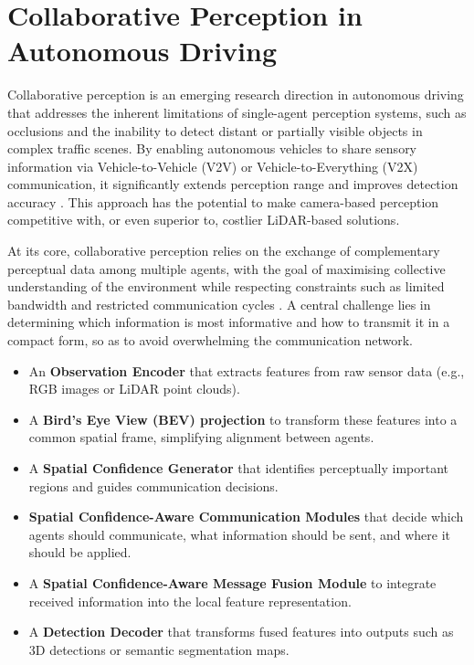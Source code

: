 \section{Collaborative Perception in Autonomous Driving}

Collaborative perception is an emerging research direction in autonomous driving that addresses the inherent limitations of single-agent perception systems, such as occlusions and the inability to detect distant or partially visible objects in complex traffic scenes.
By enabling autonomous vehicles to share sensory information via Vehicle-to-Vehicle (V2V) or Vehicle-to-Everything (V2X) communication, it significantly extends perception range and improves detection accuracy \cite{hu2022where2commcommunicationefficientcollaborativeperception, xu2022cobevtcooperativebirdseye}.
This approach has the potential to make camera-based perception competitive with, or even superior to, costlier LiDAR-based solutions.

At its core, collaborative perception relies on the exchange of complementary perceptual data among multiple agents, with the goal of maximising collective understanding of the environment while respecting constraints such as limited bandwidth and restricted communication cycles \cite{hu2023collaborationhelpscameraovertake}.
A central challenge lies in determining which information is most informative and how to transmit it in a compact form, so as to avoid overwhelming the communication network.

\begin{itemize}
    \item An \textbf{Observation Encoder} that extracts features from raw sensor data (e.g., RGB images or LiDAR point clouds).
    \item A \textbf{Bird’s Eye View (BEV) projection} to transform these features into a common spatial frame, simplifying alignment between agents.
    \item A \textbf{Spatial Confidence Generator} that identifies perceptually important regions and guides communication decisions.
    \item \textbf{Spatial Confidence-Aware Communication Modules} that decide which agents should communicate, what information should be sent, and where it should be applied.
    \item A \textbf{Spatial Confidence-Aware Message Fusion Module} to integrate received information into the local feature representation.
    \item A \textbf{Detection Decoder} that transforms fused features into outputs such as 3D detections or semantic segmentation maps.
\end{itemize}

